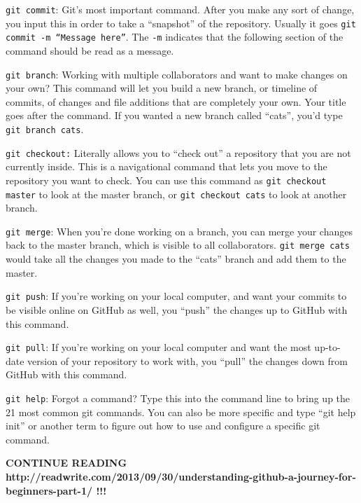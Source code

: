 \documentclass[11pt,a4paper]{article}
\begin{document}
\weeskip
{\tt git commit}: Git’s most important command. After you make any
sort of change, you input this in order to take a ``snapshot'' of the
repository. Usually it goes {\tt git commit -m ``Message here''}.  The
{\tt -m} indicates that the following section of the command should be
read as a message.

\weeskip
{\tt git branch}: Working with multiple collaborators and want to make
changes on your own? This command will let you build a new branch, or
timeline of commits, of changes and file additions that are completely
your own. Your title goes after the command. If you wanted a new
branch called ``cats'', you'd type {\tt git branch cats}.

\weeskip
{\tt git checkout:} Literally allows you to ``check out'' a repository
that you are not currently inside. This is a navigational command that
lets you move to the repository you want to check. You can use this
command as {\tt git checkout master} to look at the master branch, or
{\tt git checkout cats} to look at another branch.

\weeskip
{\tt git merge}: When you’re done working on a branch, you can merge
your changes back to the master branch, which is visible to all
collaborators. {\tt git merge cats} would take all the changes you
made to the ``cats'' branch and add them to the master.

\weeskip
{\tt git push}: If you’re working on your local computer, and want
your commits to be visible online on GitHub as well, you ``push'' the
changes up to GitHub with this command.

\weeskip
{\tt git pull}: If you’re working on your local computer and want the
most up-to-date version of your repository to work with, you ``pull''
the changes down from GitHub with this command.

\weeskip
{\tt git help}: Forgot a command? Type this into the command line to
bring up the 21 most common git commands. You can also be more
specific and type ``git help init'' or another term to figure out how
to use and configure a specific git command.

{\bf 
CONTINUE READING 
http://readwrite.com/2013/09/30/understanding-github-a-journey-for-beginners-part-1/
!!!
}
\end{document}
